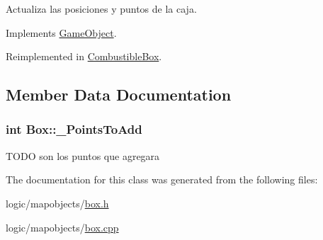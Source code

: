 Actualiza las posiciones y puntos de la caja. 



Implements \hyperlink{class_game_object_ae83128d0e0efef691417779605ee037c}{Game\-Object}.



Reimplemented in \hyperlink{class_combustible_box_ac3bcbb721576f4b00b0f2d7e48994657}{Combustible\-Box}.



\subsection{Member Data Documentation}
\hypertarget{class_box_a6bad20b31366e6c10dd372d46521f566}{
\subsubsection[{\-\_\-\-Points\-To\-Add}]{\setlength{\rightskip}{0pt plus 5cm}int Box\-::\-\_\-\-Points\-To\-Add\hspace{0.3cm}{\ttfamily [protected]}}}\label{class_box_a6bad20b31366e6c10dd372d46521f566}
T\-O\-D\-O son los puntos que agregara 

The documentation for this class was generated from the following files\-:\begin{DoxyCompactItemize}
\item 
logic/mapobjects/\hyperlink{box_8h}{box.\-h}\item 
logic/mapobjects/\hyperlink{box_8cpp}{box.\-cpp}\end{DoxyCompactItemize}
